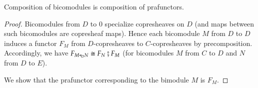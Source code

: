\documentclass{amsart}
\begin{document}
\begin{prop}
  Composition of bicomodules is composition of prafunctors.
\end{prop}
\begin{proof}
  Bicomodules from $D$ to $0$ specialize copresheaves on $D$ (and maps
  between such bicomodules are copresheaf maps). Hence each bicomodule
  $M$ from $D$ to $D$ induces a functor $F_M$ from $D$-copresheaves to
  $C$-copresheaves by precomposition. Accordingly, we have
  $F_{M \mathrel{\triangleleft}_D N} \cong F_N \fatsemi F_M$ (for bicomodules $M$ from
  $C$ to $D$ and $N$ from $D$ to $E$).
  
  We show that the prafunctor corresponding to the bimodule $M$ is
  $F_M$.

  
\end{proof}
\end{document}
